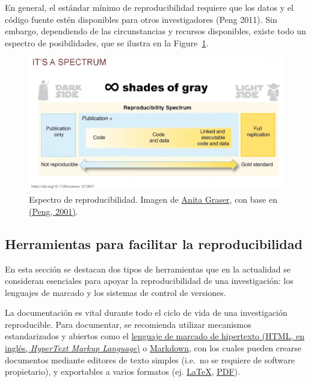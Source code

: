 \documentclass[
  letterpaper,
  DIV=11,
  numbers=noendperiod]{scrreprt}
\begin{document}
En general, el estándar mínimo de reproducibilidad requiere que los
datos y el código fuente estén disponibles para otros investigadores
(Peng 2011). Sin embargo, dependiendo de las circunstancias y recursos
disponibles, existe todo un espectro de posibilidades, que se ilustra en
la Figure~\ref{fig-espectro-reproducibilidad}.

\begin{figure}

{\centering \includegraphics[width=4.6in,height=\textheight]{./img/espectro-reproducibilidad.png}

}

\caption{\label{fig-espectro-reproducibilidad}Espectro de
reproducibilidad. Imagen de
\href{https://www.youtube.com/watch?v=ZjXb53pOor0}{Anita Graser}, con
base en \href{https://doi.org/10.1126/science.1213847}{(Peng, 2001)}.}

\end{figure}

\hypertarget{herramientas-para-facilitar-la-reproducibilidad}{%
\subsection{Herramientas para facilitar la
reproducibilidad}\label{herramientas-para-facilitar-la-reproducibilidad}}

En esta sección se destacan dos tipos de herramientas que en la
actualidad se consideran esenciales para apoyar la reproducibilidad de
una investigación: los lenguajes de marcado y los sistemas de control de
versiones.

La documentación es vital durante todo el ciclo de vida de una
investigación reproducible. Para documentar, se recomienda utilizar
mecanismos estandarizados y abiertos como el
\href{https://es.wikipedia.org/wiki/HTML}{lenguaje de marcado de
hipertexto (HTML, en inglés, \emph{HyperText Markup Language})} o
\href{https://en.wikipedia.org/wiki/Markdown}{Markdown}, con los cuales
pueden crearse documentos mediante editores de texto simples (i.e.~no se
requiere de software propietario), y exportables a varios formatos (ej.
\href{https://es.wikipedia.org/wiki/LaTeX}{LaTeX},
\href{https://es.wikipedia.org/wiki/PDF}{PDF}).
\end{document}
